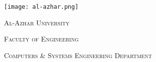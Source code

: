 {
  \begin{center}
    \texttt{[image: al-azhar.png]}
  \end{center}
  \par
}
{\scshape\large Al-Azhar University\par}
{\scshape\Large Faculty of Engineering\par}
{\scshape\LARGE Computers \& Systems Engineering Department\par}